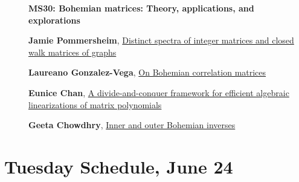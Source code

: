 \documentclass[ILAS2025-program.tex]{subfiles}
\begin{document}
    \begin{description}
    \item[] {\color{mstitle}\textbf{MS30: Bohemian matrices: Theory, applications, and explorations}} 
    \item[] \hypertarget{up0229}{}\textbf{Jamie Pommersheim}, \hyperlink{down0229}{Distinct spectra of integer matrices and closed walk matrices of graphs}
        \item[] \hypertarget{up0230}{}\textbf{Laureano Gonzalez-Vega}, \hyperlink{down0230}{On Bohemian correlation matrices}
        \item[] \hypertarget{up0231}{}\textbf{Eunice Chan}, \hyperlink{down0231}{A divide-and-conquer framework for efficient algebraic linearizations of matrix polynomials}
        \item[] \hypertarget{up0232}{}\textbf{Geeta Chowdhry}, \hyperlink{down0232}{Inner and outer Bohemian inverses}
        \end{description}
    \newpage

\section*{Tuesday Schedule, June 24 }
        
\end{document}
